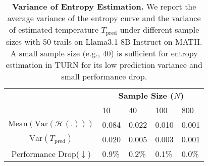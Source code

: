 \begin{table}[ht]
\centering
\caption{\textbf{Variance of Entropy Estimation.} We report the average variance of the entropy curve and the variance of estimated temperature \(T_{\text{pred}}\) under different sample sizes with $50$ trails on Llama3.1-8B-Instruct on MATH. A small sample size (e.g., $40$) is sufficient for entropy estimation in \textsc{TURN} for its low prediction variance and small performance drop.}
\label{tab: sample variance}
\small
\centering
\begin{tabularx}{0.48\textwidth}{c|XXXX}
\toprule
                      & \multicolumn{4}{c}{\textbf{Sample Size (\(N\))}} \\
\multicolumn{1}{r|}{} & 10      & 40     & 100  & 800  \\ \hline
\(\text{Mean}\left(\text{Var}\left({\mathcal{H(.)}}\right)\right)\)             &    0.084    &    0.022    &    0.010  & 0.001 \\
\(\text{Var}\left(T_{\text{pred}}\right)\) & 0.020 & 0.005 & 0.003 & 0.001 \\
\hline
Performance Drop($\downarrow$) & 0.9\% & 0.2\% & 0.1\% & 0.0\% \\
\bottomrule
\end{tabularx}
\vspace{-4mm}
\end{table}